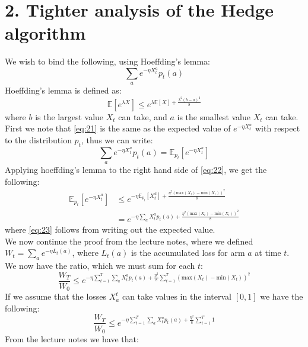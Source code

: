 \documentclass{article}
\begin{document}
\section{2. Tighter analysis of the Hedge algorithm}
We wish to bind the following, using Hoeffding's lemma: 
\begin{equation}
\label{eq:21}
\sum\limits_{a} e^{-\eta X_t^a} p_t(a)  
\end{equation}
Hoeffding's lemma is defined as:
\begin{equation}
\mathbb{E}[e^{\lambda X}] \leq e^{\lambda \mathbb{E}[X] + \frac{\lambda^2(b-a)^2}{8}}
\end{equation}
where $b$ is the largest value $X_t$ can take, and $a$ is the smallest value $X_t$ can take. First we note that \eqref{eq:21} is the same as the expected value of $e^{-\eta X_t^ a}$ with respect to the distribution $p_t$, thus we can write:
\begin{equation}
\label{eq:22}
\sum\limits_{a} e^{-\eta X_t^a} p_t(a) = \mathbb{E}_{p_t}[e^{-\eta X_t^a}]
\end{equation}
Applying hoeffding's lemma to the right hand side of \eqref{eq:22}, we get the following:
\begin{align}
\mathbb{E}_{p_t}[e^{-\eta X_t^a}] &\leq e^{-\eta \mathbb{E}_{p_t}[X_t^a] + \frac{\eta^2 (\text{max}(X_t) - \text{min}(X_t))^2}{8} } \\
&= e^{- \eta \sum\limits_{a} X_t^a p_t(a) + \frac{\eta^2 (\text{max}(X_t) - \text{min}(X_t))^2}{8} }
\label{eq:23}
\end{align}
where \eqref{eq:23} follows from writing out the expected value. \\
We now continue the proof from the lecture notes, where we defined $W_t = \sum_a e^{-\eta L_t(a)}$, where $L_t(a)$ is the accumulated loss for arm $a$ at time $t$.\\
We now have the ratio, which we must sum for each $t$:
\begin{equation}
\dfrac{W_T}{W_0} \leq e^{- \eta \sum_{t=1}^T \sum_{a} X_t^a p_t(a) + \frac{\eta^2}{8} \sum_{t=1}^T (\text{max}(X_t) - \text{min}(X_t))^2}
\end{equation}
If we assume that the losses $X^t_a$ can take values in the interval $[0,1]$ we have the following:
\begin{equation}
\label{eq:25}
\dfrac{W_T}{W_0} \leq e^{- \eta \sum_{t=1}^T \sum_{a} X_t^a p_t(a) + \frac{\eta^2}{8} \sum_{t=1}^T 1}
\end{equation}
From the lecture notes we have that: 
\end{document}
